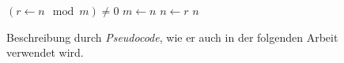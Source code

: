 \begin{figure}
    \centering
    \begin{codebox}
        \li \While $(r \gets n \mod m) \neq 0$
        \li     \Do
                    $m \gets n$                 \label{ln:euclid-while-begin}
        \li         $n \gets r$                 \label{ln:euclid-while-end}
                \End
        \li \Return $n$                         \label{ln:euclid-return}
    \end{codebox}
    \caption{Beschreibung durch \emph{Pseudocode}, wie er auch in der folgenden Arbeit verwendet wird.}
    \label{fig:pseudocode-algorithm-specification}
\end{figure}